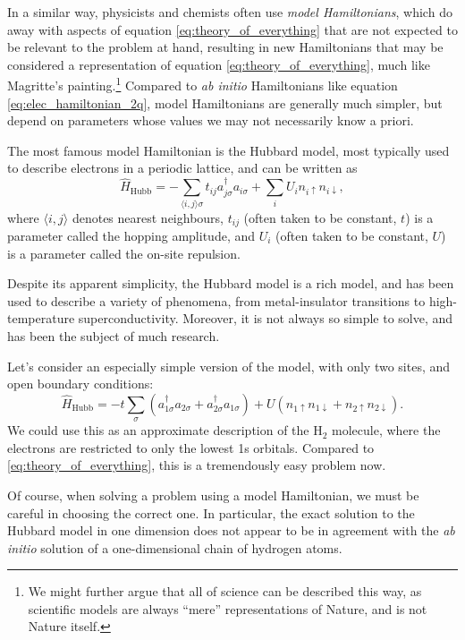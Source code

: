 In a similar way, physicists and chemists often use \emph{model Hamiltonians}, which do away with aspects of equation \eqref{eq:theory_of_everything} that are not expected to be relevant to the problem at hand, resulting in new Hamiltonians that may be considered a representation of equation \eqref{eq:theory_of_everything}, much like Magritte's painting.\footnote{We might further argue that all of science can be described this way, as scientific models are always ``mere'' representations of Nature, and is not Nature itself.} Compared to \emph{ab initio} Hamiltonians like equation \eqref{eq:elec_hamiltonian_2q}, model Hamiltonians are generally much simpler, but depend on parameters whose values we may not necessarily know a priori.

The most famous model Hamiltonian is the Hubbard model,\cite{Hubbard1963} most typically used to describe electrons in a periodic lattice, and can be written as
\begin{equation}
\label{eq:hubbard}
\hat H_\mathrm{Hubb} = - \sum_{\langle i,j\rangle \sigma} t_{ij} a_{j\sigma}^\dag a_{i\sigma} + \sum_i U_in_{i\uparrow}n_{i\downarrow},
\end{equation}
where $\langle i,j\rangle$ denotes nearest neighbours, $t_{ij}$ (often taken to be constant, $t$) is a parameter called the hopping amplitude, and $U_i$ (often taken to be constant, $U$) is a parameter called the on-site repulsion.

Despite its apparent simplicity, the Hubbard model is a rich model, and has been used to describe a variety of phenomena, from metal-insulator transitions to high-temperature superconductivity. Moreover, it is not always so simple to solve, and has been the subject of much research.\cite{Lieb1968a,liebermannFCIQMC2023}

Let's consider an especially simple version of the model, with only two sites, and open boundary conditions:
\begin{equation}
\label{eq:hubbard_h2}
\hat H_\mathrm{Hubb} = - t\sum_{\sigma}(a_{1\sigma}^\dag a_{2\sigma} + a_{2\sigma}^\dag a_{1\sigma}) + U(n_{1\uparrow}n_{1\downarrow}+n_{2\uparrow}n_{2\downarrow}).
\end{equation}
We could use this as an approximate description of the H$_2$ molecule, where the electrons are restricted to only the lowest 1s orbitals. Compared to \eqref{eq:theory_of_everything}, this is a tremendously easy problem now.

Of course, when solving a problem using a model Hamiltonian, we must be careful in choosing the correct one. In particular, the exact solution to the Hubbard model in one dimension\cite{Lieb1968a} does not appear to be in agreement with the \emph{ab initio} solution of a one-dimensional chain of hydrogen atoms.\cite{Motta2017,Motta2020}

